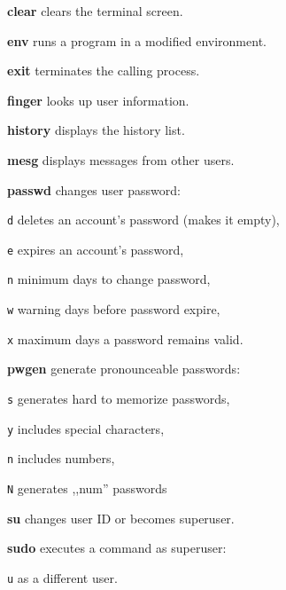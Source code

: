 \begin{enumx}
	\item [\cmd] \textbf{clear} clears the terminal screen.
	\item [\cmd] \textbf{env} runs a program in a modified environment.
	\item [\cmd] \textbf{exit} terminates the calling process.
	\item [\cmd] \textbf{finger} looks up user information.
	\item [\cmd] \textbf{history}  displays the history list. %
	\item [\cmd] \textbf{mesg} displays messages from other users.
\end{enumx}

\begin{enumx}
	\item [\cmd] \textbf{passwd} changes user password:
	\item [\texttt{d}] deletes an account's password (makes it empty),
	\item [\texttt{e}] expires an account's password,
	\item [\texttt{n}] minimum days to change password,
	\item [\texttt{w}] warning days before password expire,
	\item [\texttt{x}] maximum days a password remains valid.
	\item [\cmd] \textbf{pwgen} generate pronounceable passwords:
	\item [\texttt{s}] generates hard to memorize passwords,
	\item [\texttt{y}] includes special characters,
	\item [\texttt{n}] includes numbers,
	\item [\texttt{N}] generates ,,num'' passwords
\end{enumx}

\begin{enumx}
        \item [\cmd] \textbf{su} changes user ID or becomes superuser.
        \item [\cmd] \textbf{sudo} executes a command as superuser:
        \item [\texttt{u}] as a different user.
\end{enumx}


